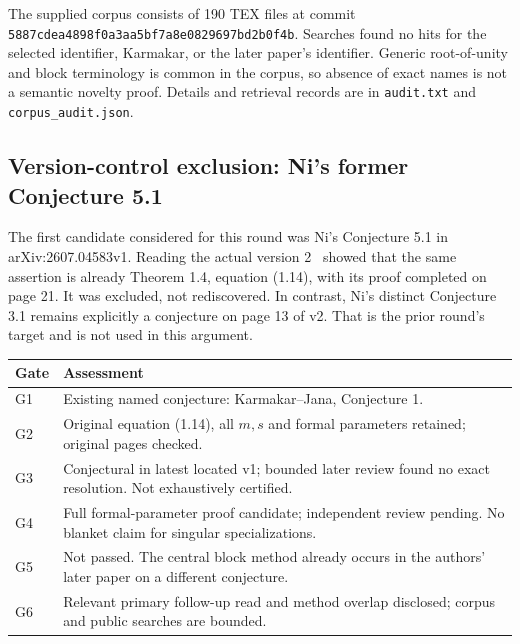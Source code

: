 \documentclass[11pt,a4paper]{article}
\begin{document}
The supplied corpus consists of 190 TEX files at commit
\texttt{5887cdea4898f0a3aa5b}\allowbreak\texttt{f7a8e0829697bd2b0f4b}.
Searches found no hits for the selected identifier, Karmakar, or the later
paper's identifier. Generic root-of-unity and block terminology is common
in the corpus, so absence of exact names is not a semantic novelty proof.
Details and retrieval records are in \texttt{audit.txt} and
\texttt{corpus\_audit.json}.

\subsection*{Version-control exclusion: Ni's former Conjecture 5.1}
The first candidate considered for this round was Ni's Conjecture 5.1 in
arXiv:2607.04583v1. Reading the actual version 2~\cite{Ni} showed that the
same assertion is already Theorem 1.4, equation (1.14), with its proof
completed on page 21. It was excluded, not rediscovered. In contrast,
Ni's distinct Conjecture 3.1 remains explicitly a conjecture on page 13
of v2. That is the prior round's target and is not used in this argument.

\begin{center}\small
\begin{tabular}{@{}p{.08\linewidth}p{.84\linewidth}@{}}\toprule
Gate&Assessment\\\midrule
G1&Existing named conjecture: Karmakar--Jana, Conjecture 1.\\
G2&Original equation (1.14), all $m,s$ and formal parameters retained; original pages checked.\\
G3&Conjectural in latest located v1; bounded later review found no exact resolution. Not exhaustively certified.\\
G4&Full formal-parameter proof candidate; independent review pending. No blanket claim for singular specializations.\\
G5&Not passed. The central block method already occurs in the authors' later paper on a different conjecture.\\
G6&Relevant primary follow-up read and method overlap disclosed; corpus and public searches are bounded.\\\bottomrule
\end{tabular}
\end{center}
\end{document}
